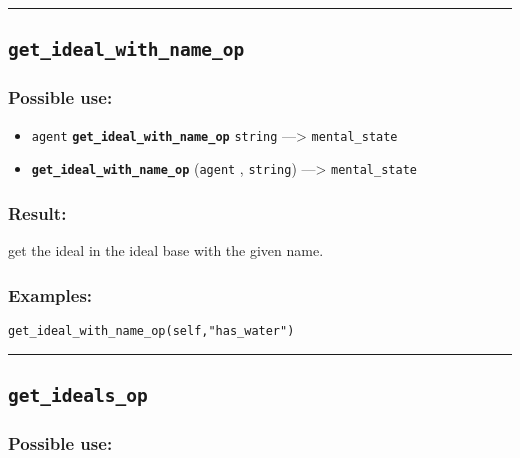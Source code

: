 \documentclass[]{book}
\providecommand{\tightlist}{%
  \setlength{\itemsep}{0pt}\setlength{\parskip}{0pt}}
\theoremstyle{definition}
\theoremstyle{definition}
\theoremstyle{definition}
\theoremstyle{remark}
\begin{document}
\begin{center}\rule{0.5\linewidth}{\linethickness}\end{center}

\subsection{\texorpdfstring{\texttt{get\_ideal\_with\_name\_op}}{get\_ideal\_with\_name\_op}}\label{get_ideal_with_name_op}

\subsubsection{Possible use:}\label{possible-use-210}

\begin{itemize}
\tightlist
\item
  \texttt{agent} \textbf{\texttt{get\_ideal\_with\_name\_op}}
  \texttt{string} ---\textgreater{} \texttt{mental\_state}
\item
  \textbf{\texttt{get\_ideal\_with\_name\_op}} (\texttt{agent} ,
  \texttt{string}) ---\textgreater{} \texttt{mental\_state}
\end{itemize}

\subsubsection{Result:}\label{result-204}

get the ideal in the ideal base with the given name.

\subsubsection{Examples:}\label{examples-157}

\begin{verbatim}
get_ideal_with_name_op(self,"has_water") 
\end{verbatim}

\begin{center}\rule{0.5\linewidth}{\linethickness}\end{center}

\subsection{\texorpdfstring{\texttt{get\_ideals\_op}}{get\_ideals\_op}}\label{get_ideals_op}

\subsubsection{Possible use:}\label{possible-use-211}
\end{document}
